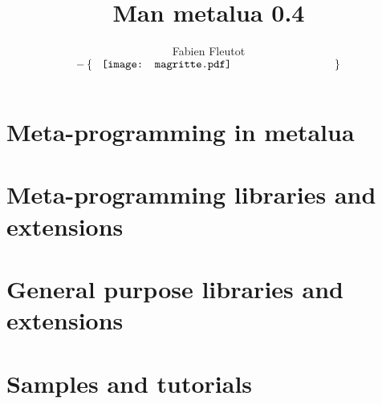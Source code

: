 \documentclass{book}
\title{Man metalua 0.4}
\author{Fabien {\sc Fleutot}\\[10mm] 
  $-\left\{\begin{minipage}{7.6cm}
      \hspace{3mm}\texttt{[image: magritte.pdf]}
    \end{minipage}\right\}$}
\begin{document}
\pagestyle{fancy}
\setlength\parskip{0.2cm}

\maketitle

\tableofcontents

\chapter[meta-programming]{Meta-programming in metalua}





\chapter[meta-libraries]{Meta-programming libraries and extensions}







\chapter[generic libraries]{General purpose libraries and extensions}




%

\chapter{Samples and tutorials}



%

\appendix


\end{document}
